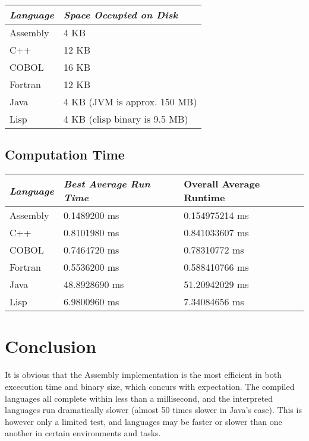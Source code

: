 \documentclass[11pt,a4paper]{article}
\begin{document}
		\begin{center}
		\bgroup
		\def\arraystretch{1.5}
			\begin{tabular}{|l|l|}
				\hline
				\textit{Language} & \textit{Space Occupied on Disk}	\\ \hline
				Assembly & 4 KB                          			\\
				C++      & 12 KB                         			\\
				COBOL    & 16 KB                         			\\
				Fortran  & 12 KB                         			\\
				Java     & 4 KB (JVM is approx. 150 MB)  			\\ 
				Lisp     & 4 KB (clisp binary is 9.5 MB) 			\\ \hline
			\end{tabular}
		\egroup
		\end{center}
		\space
		\subsection*{Computation Time}
			\space
			\begin{center}
				\bgroup
				\def\arraystretch{1.5}
				\begin{tabular}{|l|l|l|}
					\hline
					\textit{Language} & \textit{Best Average Run Time} & Overall Average Runtime\\ \hline
					Assembly & 0.1489200 ms  & 0.154975214 ms       \\
					C++      & 0.8101980 ms  & 0.841033607 ms       \\
					COBOL    & 0.7464720 ms  & 0.78310772 ms       \\
					Fortran  & 0.5536200 ms  & 0.588410766 ms       \\
					Java     & 48.8928690 ms & 51.20942029 ms       \\ 
					Lisp     & 6.9800960 ms  & 7.34084656 ms       \\ \hline
				\end{tabular}
				\egroup
			\end{center}
	\section*{Conclusion}
	
	It is obvious that the Assembly implementation is the most efficient in both excecution time and binary size, which concurs with expectation. The compiled languages all complete within less than a millisecond, and the interpreted languages run dramatically slower (almost 50 times slower in Java's case). This is however only a limited test, and languages may be faster or slower than one another in certain environments and tasks.
	
\end{document}
